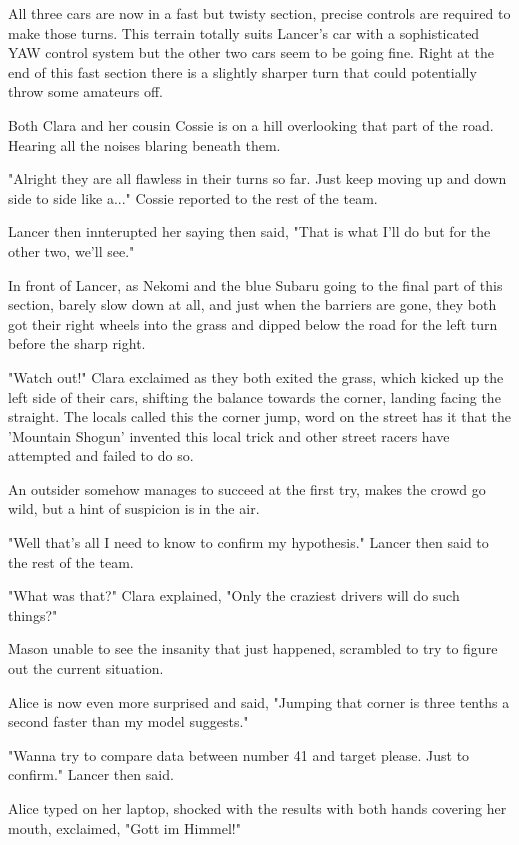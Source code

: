 All three cars are now in a fast but twisty section, precise controls are required to make those turns. This terrain totally suits Lancer's car with a sophisticated YAW control system but the other two cars seem to be going fine. Right at the end of this fast section there is a slightly sharper turn that could potentially throw some amateurs off.

Both Clara and her cousin Cossie is on a hill overlooking that part of the road. Hearing all the noises blaring beneath them.

"Alright they are all flawless in their turns so far. Just keep moving up and down side to side like a..." Cossie reported to the rest of the team.

Lancer then innterupted her saying then said, "That is what I'll do but for the other two, we'll see."

In front of Lancer, as Nekomi and the blue Subaru going to the final part of this section, barely slow down at all, and just when the barriers are gone, they both got their right wheels into the grass and dipped below the road for the left turn before the sharp right.

"Watch out!" Clara exclaimed as they both exited the grass, which kicked up the left side of their cars, shifting the balance towards the corner, landing facing the straight. The locals called this the corner jump, word on the street has it that the 'Mountain Shogun' invented this local trick and other street racers have attempted and failed to do so.

An outsider somehow manages to succeed at the first try, makes the crowd go wild, but a hint of suspicion is in the air.

"Well that's all I need to know to confirm my hypothesis." Lancer then said to the rest of the team.

"What was that?" Clara explained, "Only the craziest drivers will do such things?"

Mason unable to see the insanity that just happened, scrambled to try to figure out the current situation.

Alice is now even more surprised and said, "Jumping that corner is three tenths a second faster than my model suggests."

"Wanna try to compare data between number 41 and target please. Just to confirm." Lancer then said.

Alice typed on her laptop, shocked with the results with both hands covering her mouth, exclaimed, "Gott im Himmel!"

